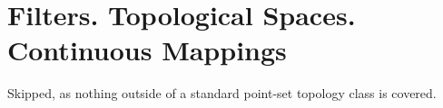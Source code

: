 \section{Filters. Topological Spaces. Continuous Mappings}

Skipped, as nothing outside of a standard point-set topology class is covered.


